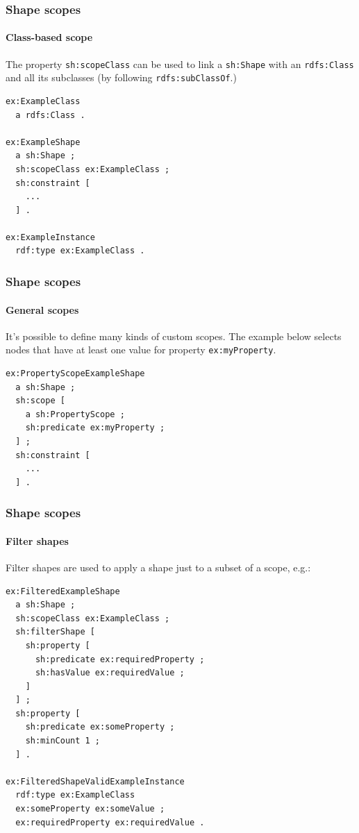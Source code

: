 \documentclass{beamer}
\begin{document}
\begin{frame}[fragile]
  \frametitle{Shape scopes}
  \framesubtitle{Class-based scope}

  The property \texttt{sh:scopeClass} can be used to link a \texttt{sh:Shape}
  with an \texttt{rdfs:Class} and all its subclasses (by following
  \texttt{rdfs:subClassOf}.)

  \vspace{1cm}

  \begin{Verbatim}[fontsize=\footnotesize]
ex:ExampleClass
  a rdfs:Class .

ex:ExampleShape
  a sh:Shape ;
  sh:scopeClass ex:ExampleClass ;
  sh:constraint [
    ...
  ] .

ex:ExampleInstance
  rdf:type ex:ExampleClass .
  \end{Verbatim}
\end{frame}

\begin{frame}[fragile]
  \frametitle{Shape scopes}
  \framesubtitle{General scopes}

  It's possible to define many kinds of custom scopes. The example below
  selects nodes that have at least one value for property
  \texttt{ex:myProperty}.

  \vspace{1cm}

  \begin{Verbatim}
ex:PropertyScopeExampleShape
  a sh:Shape ;
  sh:scope [
    a sh:PropertyScope ;
    sh:predicate ex:myProperty ;
  ] ;
  sh:constraint [
    ...
  ] .
  \end{Verbatim}
\end{frame}

\begin{frame}[fragile]
  \frametitle{Shape scopes}
  \framesubtitle{Filter shapes}

  Filter shapes are used to apply a shape just to a subset of a scope, e.g.:

  \begin{Verbatim}[fontsize=\footnotesize]
ex:FilteredExampleShape
  a sh:Shape ;
  sh:scopeClass ex:ExampleClass ;
  sh:filterShape [
    sh:property [
      sh:predicate ex:requiredProperty ;
      sh:hasValue ex:requiredValue ;
    ]
  ] ;
  sh:property [
    sh:predicate ex:someProperty ;
    sh:minCount 1 ;
  ] .

ex:FilteredShapeValidExampleInstance
  rdf:type ex:ExampleClass
  ex:someProperty ex:someValue ;
  ex:requiredProperty ex:requiredValue .
  \end{Verbatim}
\end{frame}
\end{document}
